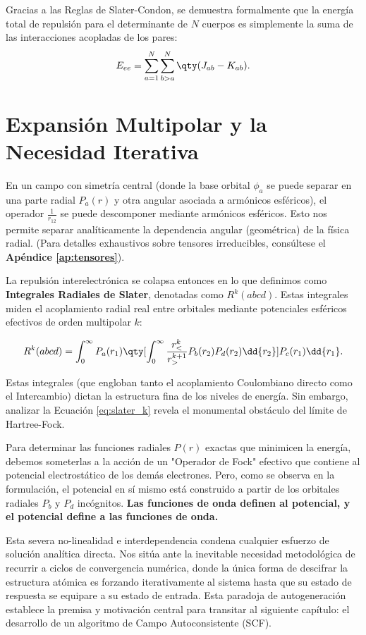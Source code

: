 Gracias a las Reglas de Slater-Condon, se demuestra formalmente que la energía total de repulsión para el determinante de $N$ cuerpos es simplemente la suma de las interacciones acopladas de los pares:
\begin{equation}
  E_{ee} = \sum_{a=1}^N \sum_{b>a}^N \qty( J_{ab} - K_{ab} ).
\end{equation}

\section{Expansión Multipolar y la Necesidad Iterativa}

En un campo con simetría central (donde la base orbital $\phi_{a}$ se puede separar en una parte radial $P_a(r)$ y otra angular asociada a armónicos esféricos), el operador $\frac{1}{r_{12}}$ se puede descomponer mediante armónicos esféricos. Esto nos permite separar analíticamente la dependencia angular (geométrica) de la física radial. (Para detalles exhaustivos sobre tensores irreducibles, consúltese el \textbf{Apéndice \ref{ap:tensores}}). 

La repulsión interelectrónica se colapsa entonces en lo que definimos como \textbf{Integrales Radiales de Slater}, denotadas como $R^k(abcd)$. Estas integrales miden el acoplamiento radial real entre orbitales mediante potenciales esféricos efectivos de orden multipolar $k$:

\begin{equation}
  \label{eq:slater_k}
  R^k(abcd) = \int_0^\infty P_a(r_1) \qty[ \int_0^\infty \frac{r_{<}^k}{r_{>}^{k+1}} P_b(r_2) P_d(r_2) \dd{r_2} ] P_c(r_1) \dd{r_1}.
\end{equation}

Estas integrales (que engloban tanto el acoplamiento Coulombiano directo como el Intercambio) dictan la estructura fina de los niveles de energía. Sin embargo, analizar la Ecuación \eqref{eq:slater_k} revela el monumental obstáculo del límite de Hartree-Fock.

Para determinar las funciones radiales $P(r)$ exactas que minimicen la energía, debemos someterlas a la acción de un "Operador de Fock" efectivo que contiene al potencial electrostático de los demás electrones. Pero, como se observa en la formulación, el potencial en sí mismo está construido a partir de los orbitales radiales $P_b$ y $P_d$ incógnitos. \textbf{Las funciones de onda definen al potencial, y el potencial define a las funciones de onda.}

Esta severa no-linealidad e interdependencia condena cualquier esfuerzo de solución analítica directa. Nos sitúa ante la inevitable necesidad metodológica de recurrir a ciclos de convergencia numérica, donde la única forma de descifrar la estructura atómica es forzando iterativamente al sistema hasta que su estado de respuesta se equipare a su estado de entrada. Esta paradoja de autogeneración establece la premisa y motivación central para transitar al siguiente capítulo: el desarrollo de un algoritmo de Campo Autoconsistente (SCF).
